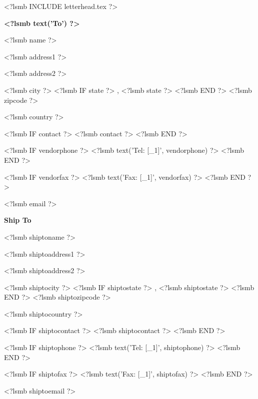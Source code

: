 \documentclass{scrartcl}
\begin{document}
\pagestyle{myheadings}
\thispagestyle{empty}

\fontsize{10pt}{12pt}\selectfont

<?lsmb INCLUDE letterhead.tex ?>




\vspace*{0.5cm}

\parbox[t]{.5\textwidth}{
\textbf{<?lsmb text('To') ?>}
\vspace{0.3cm}
  
<?lsmb name ?>

<?lsmb address1 ?>

<?lsmb address2 ?>

<?lsmb city ?>
<?lsmb IF state ?>
\hspace{-0.1cm}, <?lsmb state ?>
<?lsmb END ?>
<?lsmb zipcode ?>

<?lsmb country ?>

\vspace{0.3cm}

<?lsmb IF contact ?>
<?lsmb contact ?>
\vspace{0.2cm}
<?lsmb END ?>

<?lsmb IF vendorphone ?>
<?lsmb text('Tel: [_1]', vendorphone) ?>
<?lsmb END ?>

<?lsmb IF vendorfax ?>
<?lsmb text('Fax: [_1]', vendorfax) ?>
<?lsmb END ?>

<?lsmb email ?>
}
\parbox[t]{.5\textwidth}{
\textbf{Ship To}
\vspace{0.3cm}

<?lsmb shiptoname ?>

<?lsmb shiptoaddress1 ?>

<?lsmb shiptoaddress2 ?>

<?lsmb shiptocity ?>
<?lsmb IF shiptostate ?>
\hspace{-0.1cm}, <?lsmb shiptostate ?>
<?lsmb END ?>
<?lsmb shiptozipcode ?>

<?lsmb shiptocountry ?>

\vspace{0.3cm}

<?lsmb IF shiptocontact ?>
<?lsmb shiptocontact ?>
\vspace{0.2cm}
<?lsmb END ?>

<?lsmb IF shiptophone ?>
<?lsmb text('Tel: [_1]', shiptophone) ?>
<?lsmb END ?>

<?lsmb IF shiptofax ?>
<?lsmb text('Fax: [_1]', shiptofax) ?>
<?lsmb END ?>

<?lsmb shiptoemail ?>
}
\hfill
\end{document}

